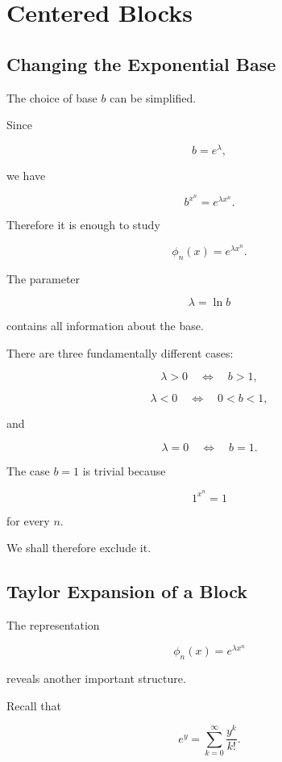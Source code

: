 
\chapter{Centered Blocks}

\section{Changing the Exponential Base}

The choice of base \(b\) can be simplified.

Since

\[
b=e^\lambda,
\]

we have

\[
b^{x^n}
=
e^{\lambda x^n}.
\]

Therefore it is enough to study

\[
\boxed{
\phi_n(x)=e^{\lambda x^n}.
}
\]

The parameter

\[
\lambda=\ln b
\]

contains all information about the base.

There are three fundamentally different cases:

\[
\lambda>0
\quad\Longleftrightarrow\quad
b>1,
\]

\[
\lambda<0
\quad\Longleftrightarrow\quad
0<b<1,
\]

and

\[
\lambda=0
\quad\Longleftrightarrow\quad
b=1.
\]

The case \(b=1\) is trivial because

\[
1^{x^n}=1
\]

for every \(n\).

We shall therefore exclude it.

\section{Taylor Expansion of a Block}

The representation

\[
\phi_n(x)=e^{\lambda x^n}
\]

reveals another important structure.

Recall that

\[
e^y
=
\sum_{k=0}^{\infty}\frac{y^k}{k!}.
\]

